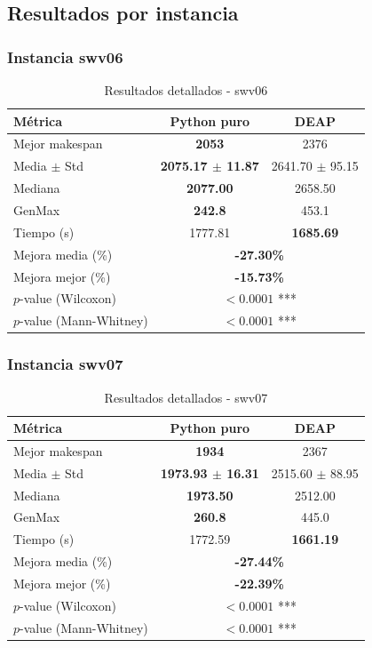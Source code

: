 \documentclass[12pt,a4paper]{article}
\begin{document}
\subsection{Resultados por instancia}

\subsubsection{Instancia swv06}

\begin{table}[H]
\centering
\caption{Resultados detallados - swv06}
\label{tab:swv06}
\begin{tabular}{@{}lcc@{}}
\toprule
\textbf{Métrica} & \textbf{Python puro} & \textbf{DEAP} \\ \midrule
Mejor makespan & \textbf{2053} & 2376 \\
Media $\pm$ Std & \textbf{2075.17 $\pm$ 11.87} & 2641.70 $\pm$ 95.15 \\
Mediana & \textbf{2077.00} & 2658.50 \\
GenMax & \textbf{242.8} & 453.1 \\
Tiempo (s) & 1777.81 & \textbf{1685.69} \\ \midrule
Mejora media (\%) & \multicolumn{2}{c}{\textbf{-27.30\%}} \\
Mejora mejor (\%) & \multicolumn{2}{c}{\textbf{-15.73\%}} \\
$p$-value (Wilcoxon) & \multicolumn{2}{c}{$< 0.0001$ ***} \\
$p$-value (Mann-Whitney) & \multicolumn{2}{c}{$< 0.0001$ ***} \\
\bottomrule
\end{tabular}
\end{table}

\subsubsection{Instancia swv07}

\begin{table}[H]
\centering
\caption{Resultados detallados - swv07}
\label{tab:swv07}
\begin{tabular}{@{}lcc@{}}
\toprule
\textbf{Métrica} & \textbf{Python puro} & \textbf{DEAP} \\ \midrule
Mejor makespan & \textbf{1934} & 2367 \\
Media $\pm$ Std & \textbf{1973.93 $\pm$ 16.31} & 2515.60 $\pm$ 88.95 \\
Mediana & \textbf{1973.50} & 2512.00 \\
GenMax & \textbf{260.8} & 445.0 \\
Tiempo (s) & 1772.59 & \textbf{1661.19} \\ \midrule
Mejora media (\%) & \multicolumn{2}{c}{\textbf{-27.44\%}} \\
Mejora mejor (\%) & \multicolumn{2}{c}{\textbf{-22.39\%}} \\
$p$-value (Wilcoxon) & \multicolumn{2}{c}{$< 0.0001$ ***} \\
$p$-value (Mann-Whitney) & \multicolumn{2}{c}{$< 0.0001$ ***} \\
\bottomrule
\end{tabular}
\end{table}
\end{document}
